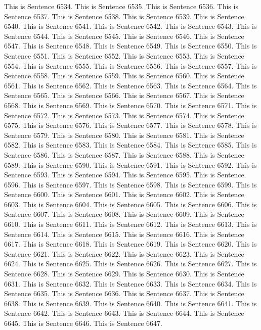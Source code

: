 \documentclass{article}
\begin{document}
This is Sentence 6534.
This is Sentence 6535.
This is Sentence 6536.
This is Sentence 6537.
This is Sentence 6538.
This is Sentence 6539.
This is Sentence 6540.
This is Sentence 6541.
This is Sentence 6542.
This is Sentence 6543.
This is Sentence 6544.
This is Sentence 6545.
This is Sentence 6546.
This is Sentence 6547.
This is Sentence 6548.
This is Sentence 6549.
This is Sentence 6550.
This is Sentence 6551.
This is Sentence 6552.
This is Sentence 6553.
This is Sentence 6554.
This is Sentence 6555.
This is Sentence 6556.
This is Sentence 6557.
This is Sentence 6558.
This is Sentence 6559.
This is Sentence 6560.
This is Sentence 6561.
This is Sentence 6562.
This is Sentence 6563.
This is Sentence 6564.
This is Sentence 6565.
This is Sentence 6566.
This is Sentence 6567.
This is Sentence 6568.
This is Sentence 6569.
This is Sentence 6570.
This is Sentence 6571.
This is Sentence 6572.
This is Sentence 6573.
This is Sentence 6574.
This is Sentence 6575.
This is Sentence 6576.
This is Sentence 6577.
This is Sentence 6578.
This is Sentence 6579.
This is Sentence 6580.
This is Sentence 6581.
This is Sentence 6582.
This is Sentence 6583.
This is Sentence 6584.
This is Sentence 6585.
This is Sentence 6586.
This is Sentence 6587.
This is Sentence 6588.
This is Sentence 6589.
This is Sentence 6590.
This is Sentence 6591.
This is Sentence 6592.
This is Sentence 6593.
This is Sentence 6594.
This is Sentence 6595.
This is Sentence 6596.
This is Sentence 6597.
This is Sentence 6598.
This is Sentence 6599.
This is Sentence 6600.
This is Sentence 6601.
This is Sentence 6602.
This is Sentence 6603.
This is Sentence 6604.
This is Sentence 6605.
This is Sentence 6606.
This is Sentence 6607.
This is Sentence 6608.
This is Sentence 6609.
This is Sentence 6610.
This is Sentence 6611.
This is Sentence 6612.
This is Sentence 6613.
This is Sentence 6614.
This is Sentence 6615.
This is Sentence 6616.
This is Sentence 6617.
This is Sentence 6618.
This is Sentence 6619.
This is Sentence 6620.
This is Sentence 6621.
This is Sentence 6622.
This is Sentence 6623.
This is Sentence 6624.
This is Sentence 6625.
This is Sentence 6626.
This is Sentence 6627.
This is Sentence 6628.
This is Sentence 6629.
This is Sentence 6630.
This is Sentence 6631.
This is Sentence 6632.
This is Sentence 6633.
This is Sentence 6634.
This is Sentence 6635.
This is Sentence 6636.
This is Sentence 6637.
This is Sentence 6638.
This is Sentence 6639.
This is Sentence 6640.
This is Sentence 6641.
This is Sentence 6642.
This is Sentence 6643.
This is Sentence 6644.
This is Sentence 6645.
This is Sentence 6646.
This is Sentence 6647.
\end{document}

